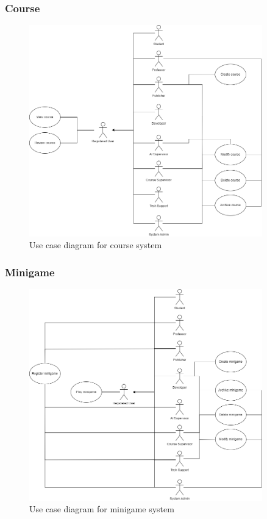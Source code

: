 \newpage
\subsubsection{Course}
\begin{figure}[h]
	\centering
	\includegraphics[width=0.9\textwidth]{images/UC-course.png}
	\caption{Use case diagram for course system}
	\label{fig:UC-course}
\end{figure}

\newpage
\subsubsection{Minigame}
\begin{figure}[h]
	\centering
	\includegraphics[width=0.9\textwidth]{images/UC-minigame.png}
	\caption{Use case diagram for minigame system}
	\label{fig:UC-course}
\end{figure}

